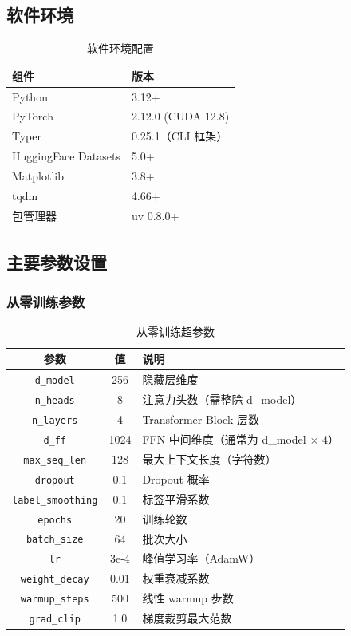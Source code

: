 \documentclass[a4paper, 12pt, centering, AutoFakeBold]{article}
\begin{document}
\subsection{软件环境}

\begin{table}[H]
\centering
\caption{软件环境配置}
\label{tab:software}
\begin{tabular}{|l|l|}
\hline
\textbf{组件} & \textbf{版本} \\
\hline
Python          & 3.12+ \\
PyTorch         & 2.12.0 (CUDA 12.8) \\
Typer           & 0.25.1（CLI 框架） \\
HuggingFace Datasets & 5.0+ \\
Matplotlib      & 3.8+ \\
tqdm            & 4.66+ \\
包管理器        & uv 0.8.0+ \\
\hline
\end{tabular}
\end{table}

\subsection{主要参数设置}

\subsubsection{从零训练参数}

\begin{table}[H]
\centering
\caption{从零训练超参数}
\label{tab:params_train}
\begin{tabular}{|c|c|l|}
\hline
\textbf{参数} & \textbf{值} & \textbf{说明} \\
\hline
\texttt{d\_model}     & 256   & 隐藏层维度 \\
\texttt{n\_heads}     & 8     & 注意力头数（需整除 d\_model） \\
\texttt{n\_layers}    & 4     & Transformer Block 层数 \\
\texttt{d\_ff}        & 1024  & FFN 中间维度（通常为 d\_model $\times$ 4） \\
\texttt{max\_seq\_len}& 128   & 最大上下文长度（字符数） \\
\texttt{dropout}      & 0.1   & Dropout 概率 \\
\texttt{label\_smoothing} & 0.1 & 标签平滑系数 \\
\texttt{epochs}       & 20    & 训练轮数 \\
\texttt{batch\_size}  & 64    & 批次大小 \\
\texttt{lr}           & 3e-4  & 峰值学习率（AdamW） \\
\texttt{weight\_decay}& 0.01  & 权重衰减系数 \\
\texttt{warmup\_steps}& 500   & 线性 warmup 步数 \\
\texttt{grad\_clip}   & 1.0   & 梯度裁剪最大范数 \\
\hline
\end{tabular}
\end{table}
\end{document}
